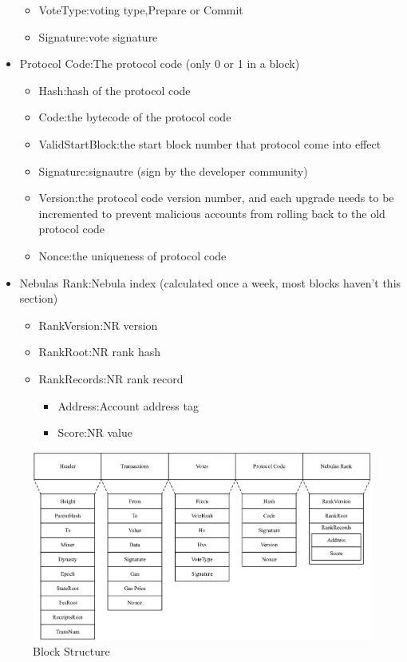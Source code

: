\begin{itemize}
\begin{itemize}
		\item VoteType:voting type,Prepare or Commit
		\item Signature:vote signature
		\end{itemize}
	\item Protocol Code:The protocol code (only 0 or 1 in a block)
		\begin{itemize}
		\item Hash:hash of the protocol code
		\item Code:the bytecode of the protocol code
		\item ValidStartBlock:the start block number that protocol come into effect
		\item Signature:signautre (sign by the developer community)
		\item Version:the protocol code version number, and each upgrade needs to be incremented to prevent malicious accounts from rolling back to the old protocol code
		\item Nonce:the uniqueness of protocol code
		\end{itemize}
	\item Nebulas Rank:Nebula index (calculated once a week, most blocks haven't this section)
		\begin{itemize}
		\item RankVersion:NR version
		\item RankRoot:NR rank hash
		\item RankRecords:NR rank record
			\begin{itemize}
				\item Address:Account address tag
				\item Score:NR value
			\end{itemize}
		\end{itemize}
\end{itemize}

\begin{figure}[!h]
\centering
\includegraphics[width=13.8cm]{./figs/block}
\caption{Block Structure}
\label{fig:block}
\end{figure}

